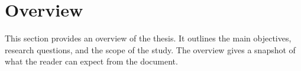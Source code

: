 	\section{Overview}
	This section provides an overview of the thesis. It outlines the main objectives, research questions, and the scope of the study. The overview gives a snapshot of what the reader can expect from the document.